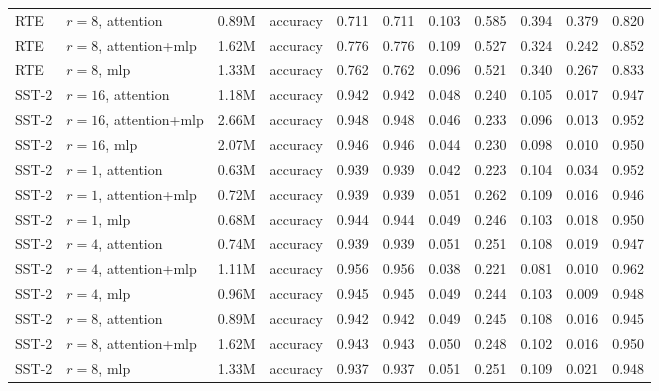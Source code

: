 {\begin{longtable}{llrlrrrrrrr}
RTE & $r=8$, attention & 0.89M & accuracy & 0.711 & 0.711 & 0.103 & 0.585 & 0.394 & 0.379 & 0.820 \\
RTE & $r=8$, attention+mlp & 1.62M & accuracy & 0.776 & 0.776 & 0.109 & 0.527 & 0.324 & 0.242 & 0.852 \\
RTE & $r=8$, mlp & 1.33M & accuracy & 0.762 & 0.762 & 0.096 & 0.521 & 0.340 & 0.267 & 0.833 \\
SST-2 & $r=16$, attention & 1.18M & accuracy & 0.942 & 0.942 & 0.048 & 0.240 & 0.105 & 0.017 & 0.947 \\
SST-2 & $r=16$, attention+mlp & 2.66M & accuracy & 0.948 & 0.948 & 0.046 & 0.233 & 0.096 & 0.013 & 0.952 \\
SST-2 & $r=16$, mlp & 2.07M & accuracy & 0.946 & 0.946 & 0.044 & 0.230 & 0.098 & 0.010 & 0.950 \\
SST-2 & $r=1$, attention & 0.63M & accuracy & 0.939 & 0.939 & 0.042 & 0.223 & 0.104 & 0.034 & 0.952 \\
SST-2 & $r=1$, attention+mlp & 0.72M & accuracy & 0.939 & 0.939 & 0.051 & 0.262 & 0.109 & 0.016 & 0.946 \\
SST-2 & $r=1$, mlp & 0.68M & accuracy & 0.944 & 0.944 & 0.049 & 0.246 & 0.103 & 0.018 & 0.950 \\
SST-2 & $r=4$, attention & 0.74M & accuracy & 0.939 & 0.939 & 0.051 & 0.251 & 0.108 & 0.019 & 0.947 \\
SST-2 & $r=4$, attention+mlp & 1.11M & accuracy & 0.956 & 0.956 & 0.038 & 0.221 & 0.081 & 0.010 & 0.962 \\
SST-2 & $r=4$, mlp & 0.96M & accuracy & 0.945 & 0.945 & 0.049 & 0.244 & 0.103 & 0.009 & 0.948 \\
SST-2 & $r=8$, attention & 0.89M & accuracy & 0.942 & 0.942 & 0.049 & 0.245 & 0.108 & 0.016 & 0.945 \\
SST-2 & $r=8$, attention+mlp & 1.62M & accuracy & 0.943 & 0.943 & 0.050 & 0.248 & 0.102 & 0.016 & 0.950 \\
SST-2 & $r=8$, mlp & 1.33M & accuracy & 0.937 & 0.937 & 0.051 & 0.251 & 0.109 & 0.021 & 0.948 \\
\bottomrule
\end{longtable}
}
